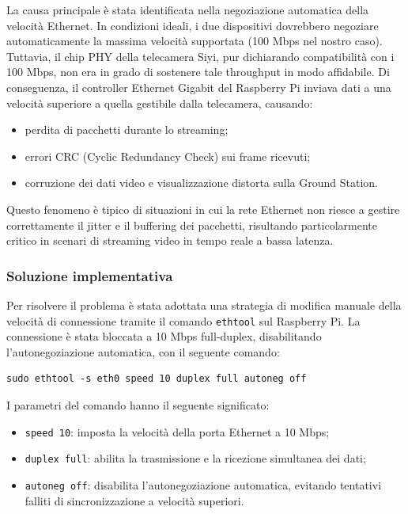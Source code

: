 La causa principale è stata identificata nella negoziazione automatica della velocità Ethernet. In condizioni ideali, i due dispositivi dovrebbero negoziare automaticamente la massima velocità supportata (100 Mbps nel nostro caso). Tuttavia, il chip PHY della telecamera Siyi, pur dichiarando compatibilità con i 100 Mbps, non era in grado di sostenere tale throughput in modo affidabile.  
Di conseguenza, il controller Ethernet Gigabit del Raspberry Pi inviava dati a una velocità superiore a quella gestibile dalla telecamera, causando:  

\begin{itemize}
    \item perdita di pacchetti durante lo streaming;
    \item errori CRC (Cyclic Redundancy Check) sui frame ricevuti;
    \item corruzione dei dati video e visualizzazione distorta sulla Ground Station.
\end{itemize}

Questo fenomeno è tipico di situazioni in cui la rete Ethernet non riesce a gestire correttamente il jitter e il buffering dei pacchetti, risultando particolarmente critico in scenari di streaming video in tempo reale a bassa latenza.

\subsubsection{Soluzione implementativa}

Per risolvere il problema è stata adottata una strategia di modifica manuale della velocità di connessione tramite il comando \texttt{ethtool} sul Raspberry Pi.  
La connessione è stata bloccata a 10 Mbps full-duplex, disabilitando l’autonegoziazione automatica, con il seguente comando:

\begin{verbatim}
sudo ethtool -s eth0 speed 10 duplex full autoneg off
\end{verbatim}

\noindent I parametri del comando hanno il seguente significato:
\begin{itemize}
    \item \texttt{speed 10}: imposta la velocità della porta Ethernet a 10 Mbps;
    \item \texttt{duplex full}: abilita la trasmissione e la ricezione simultanea dei dati;
    \item \texttt{autoneg off}: disabilita l’autonegoziazione automatica, evitando tentativi falliti di sincronizzazione a velocità superiori.
\end{itemize}

